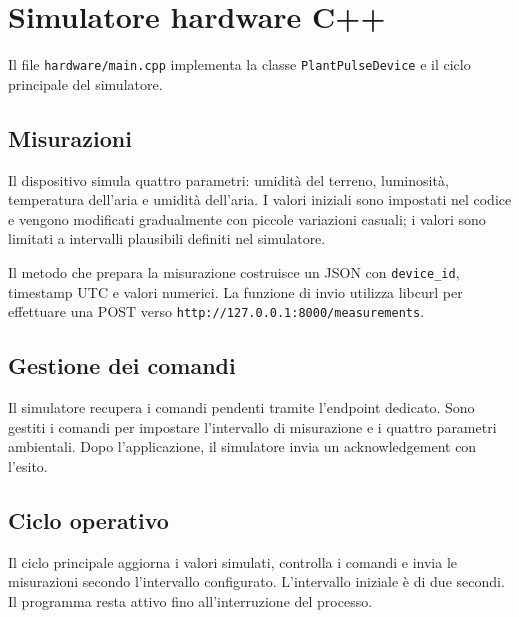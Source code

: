 \chapter{Simulatore hardware C++}

Il file \texttt{hardware/main.cpp} implementa la classe \texttt{PlantPulseDevice} e il ciclo principale del simulatore.

\section{Misurazioni}
Il dispositivo simula quattro parametri: umidità del terreno, luminosità, temperatura dell'aria e umidità dell'aria. I valori iniziali sono impostati nel codice e vengono modificati gradualmente con piccole variazioni casuali; i valori sono limitati a intervalli plausibili definiti nel simulatore.

Il metodo che prepara la misurazione costruisce un JSON con \texttt{device\_id}, timestamp UTC e valori numerici. La funzione di invio utilizza libcurl per effettuare una POST verso \texttt{http://127.0.0.1:8000/measurements}.

\section{Gestione dei comandi}
Il simulatore recupera i comandi pendenti tramite l'endpoint dedicato. Sono gestiti i comandi per impostare l'intervallo di misurazione e i quattro parametri ambientali. Dopo l'applicazione, il simulatore invia un acknowledgement con l'esito.

\section{Ciclo operativo}
Il ciclo principale aggiorna i valori simulati, controlla i comandi e invia le misurazioni secondo l'intervallo configurato. L'intervallo iniziale è di due secondi. Il programma resta attivo fino all'interruzione del processo.
